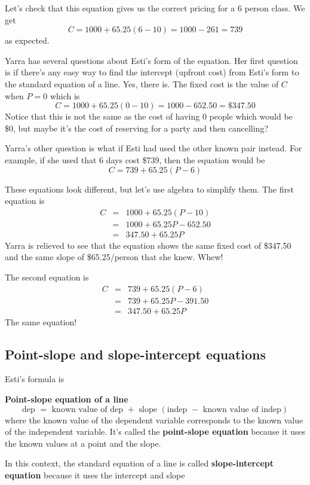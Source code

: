 Let's check that this equation gives us the correct pricing for a 6 person class.  We get
$$C = 1000 + 65.25(6-10) = 1000 - 261 = 739$$
as expected.

Yarra has several questions about Esti's form of the equation. Her first question is if there's any easy way to find the intercept (upfront cost) from Esti's form to the standard equation of a line.  Yes, there is.  The fixed cost is the value of $C$ when $P=0$ which is 
$$C = 1000 + 65.25(0-10)= 1000 -652.50 = \$347.50$$
Notice that this is not the same as the cost of having 0 people which would be \$0, but maybe it's the cost of reserving for a party and then cancelling?

Yarra's other question is what if Esti had used the other known pair instead.  For example, if she used that 6 days cost \$739, then the equation would be
$$C=739 + 65.25(P-6)$$

These equations look different, but let's use algebra to simplify them. The first equation is
\begin{eqnarray*}
    C &=& 1000 + 65.25(P-10) \\
    &=& 1000 + 65.25P - 652.50 \\
    &=& 347.50 + 65.25P
\end{eqnarray*}
Yarra is relieved to see that the equation shows the same fixed cost of \$347.50 and the same slope of \$65.25/person that she knew. Whew!

The second equation is
\begin{eqnarray*}
    C &=& 739 + 65.25(P-6) \\
    &=& 739 + 65.25P - 391.50 \\
    &=& 347.50 + 65.25P
\end{eqnarray*}
The same equation!

\subsection*{Point-slope and slope-intercept equations}

Esti's formula is 

\textbf{Point-slope equation of a line}
 $$\text{dep } = \text{ known value of dep } + \text{ slope }(\text{indep } - \text{ known value of indep})$$
where the known value of the dependent variable corresponds to the known value of the independent variable. It's called the \textbf{point-slope equation} because it uses the known values at a point and the slope.

In this context, the standard equation of a line is called \textbf{slope-intercept equation} because it uses the intercept and slope

